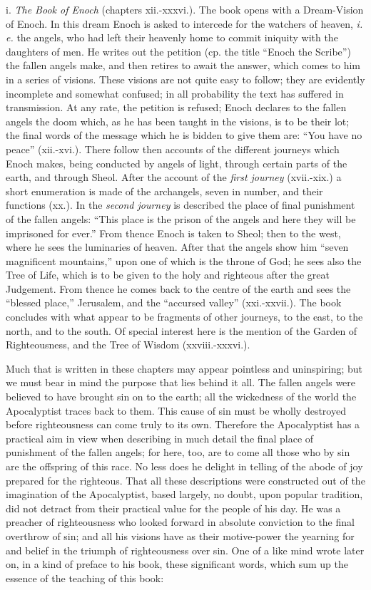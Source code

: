 i. \emph{The Book of Enoch} (chapters xii.-xxxvi.). The
book opens with a Dream-Vision of Enoch. In this
dream Enoch is asked to intercede for the watchers of
heaven, \emph{i. e.} the angels, who had left their heavenly
home to commit iniquity with the daughters of men.
He writes out the petition (cp. the title “Enoch the
Scribe”) the fallen angels make, and then retires
to await the answer, which comes to him in a series
of visions. These visions are not quite easy to follow;
they are evidently incomplete and somewhat confused;
in all probability the text has suffered in
transmission. At any rate, the petition is refused;
Enoch declares to the fallen angels the doom which,
as he has been taught in the visions, is to be their
lot; the final words of the message which he is bidden
to give them are: “You have no peace” (xii.-xvi.).
There follow then accounts of the different journeys
which Enoch makes, being conducted by angels of
light, through certain parts of the earth, and through
Sheol. After the account of the \emph{first journey} (xvii.-xix.)
a short enumeration is made of the archangels,
seven in number, and their functions (xx.). In the
\emph{second journey} is described the place of final punishment
of the fallen angels: “This place is the prison
of the angels and here they will be imprisoned for
ever.” From thence Enoch is taken to Sheol; then
to the west, where he sees the luminaries of heaven.
After that the angels show him “seven magnificent
mountains,” upon one of which is the throne of God;
he sees also the Tree of Life, which is to be given to
the holy and righteous after the great Judgement.
From thence he comes back to the centre of the
earth and sees the “blessed place,” Jerusalem, and
the “accursed valley” (xxi.-xxvii.). The book
concludes with what appear to be fragments of other
journeys, to the east, to the north, and to the south.
Of special interest here is the mention of the Garden
of Righteousness, and the Tree of Wisdom (xxviii.-xxxvi.).

Much that is written in these chapters may appear
pointless and uninspiring; but we must bear in mind
the purpose that lies behind it all. The fallen angels
were believed to have brought sin on to the earth;
all the wickedness of the world the Apocalyptist
traces back to them. This cause of sin must be
wholly destroyed before righteousness can come truly
to its own. Therefore the Apocalyptist has a practical
aim in view when describing in much detail
the final place of punishment of the fallen angels;
for here, too, are to come all those who by sin are the
offspring of this race. No less does he delight in
telling of the abode of joy prepared for the righteous.
That all these descriptions were constructed out of
the imagination of the Apocalyptist, based largely,
no doubt, upon popular tradition, did not detract
from their practical value for the people of his day.
He was a preacher of righteousness who looked
forward in absolute conviction to the final overthrow
of sin; and all his visions have as their motive-power
the yearning for and belief in the triumph
of righteousness over sin. One of a like mind wrote
later on, in a kind of preface to his book, these significant
words, which sum up the essence of the teaching
of this book:

